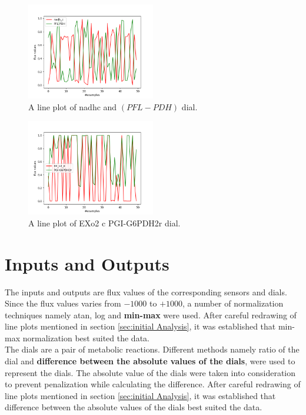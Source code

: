 \documentclass[12pt,chapterheads]{ucsd}
\begin{document}
\begin{figure}[h] 
\centering
\includegraphics[width=0.5\textwidth]{nadh_c_PFL_PDH_lineplot_50}
\caption[nadh \textunderscore c with PFL-PDH line plot]
{A line plot of nadh\textunderscore c and $(PFL-PDH)$ dial.}
\label{fig:nadhline}
\end{figure}

\begin{figure}[h] 
\centering
\includegraphics[width=0.5\textwidth]{EX_o2_e_PGI_G6PDH2r_lineplot_50}
\caption[EX\textunderscore o2 \textunderscore c with PGI-G6PDH2r line plot]
{A line plot of EX\textunderscore o2 \textunderscore c PGI-G6PDH2r dial.}
\label{fig:o2pgiline}
\end{figure}

\section{Inputs and Outputs}
The inputs and outputs are flux values of the corresponding sensors and dials.\\ Since the flux values varies from $-1000$ to $+1000$, a number of normalization techniques namely atan, log and \textbf{min-max} were used. After careful redrawing of line plots mentioned in section \ref{sec:initial Analysis}, it was established that min-max normalization best suited the data.\\
The dials are a pair of metabolic reactions. Different methods namely ratio of the dial and \textbf{difference between the absolute values of the dials}, were used to represent the dials. The absolute value of the dials were taken into consideration to prevent penalization while calculating the difference. After careful redrawing of line plots mentioned in section \ref{sec:initial Analysis}, it was established that difference between the absolute values of the dials best suited the data.\\
\end{document}
